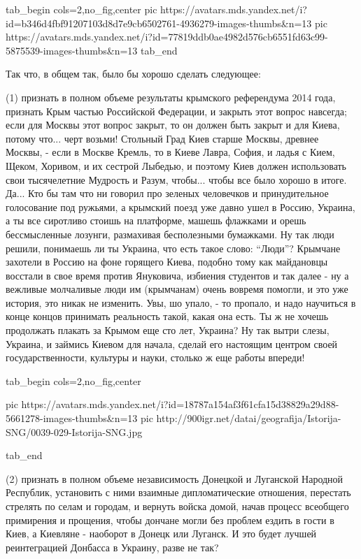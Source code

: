 \ifcmt
  tab_begin cols=2,no_fig,center
     pic https://avatars.mds.yandex.net/i?id=b346d4fbf91207103d8d7e9cb6502761-4936279-images-thumbs&n=13
     pic https://avatars.mds.yandex.net/i?id=77819ddb0ae4982d576cb6551fd63c99-5875539-images-thumbs&n=13
  tab_end
\fi

Так что, в общем так, было бы хорошо сделать следующее:

(1) признать в полном объеме результаты крымского референдума 2014 года,
признать Крым частью Российской Федерации, и закрыть этот вопрос навсегда; если
для Москвы этот вопрос закрыт, то он должен быть закрыт и для Киева, потому
что...  черт возьми! Стольный Град Киев старше Москвы, древнее Москвы, - если в
Москве Кремль, то в Киеве Лавра, София, и ладья с Кием, Щеком, Хоривом, и их
сестрой Лыбедью, и поэтому Киев должен использовать свои тысячелетние Мудрость
и Разум, чтобы... чтобы все было хорошо в итоге.  Да... Кто бы там что ни
говорил про зеленых человечков и принудительное голосование под ружьями, а
крымский поезд уже давно ушел в Россию, Украина, а ты все сиротливо стоишь на
платформе, машешь флажками и орешь бессмысленные лозунги, размахивая
бесполезными бумажками. Ну так люди решили, понимаешь ли ты Украина, что есть
такое слово: \enquote{Люди}? Крымчане захотели в Россию на фоне горящего Киева,
подобно тому как майдановцы восстали в свое время против Януковича, избиения
студентов и так далее - ну а вежливые молчаливые люди им (крымчанам) очень
вовремя помогли, и это уже история, это никак не изменить. Увы, шо упало, - то
пропало, и надо научиться в конце концов принимать реальность такой, какая она
есть. Ты ж не хочешь продолжать плакать за Крымом еще сто лет, Украина? Ну так
вытри слезы, Украина, и займись Киевом для начала, сделай его настоящим центром
своей государственности, культуры и науки, столько ж еще работы впереди! 

\ifcmt
  tab_begin cols=2,no_fig,center

     pic https://avatars.mds.yandex.net/i?id=18787a154af3f61cfa15d38829a29d88-5661278-images-thumbs&n=13
     pic http://900igr.net/datai/geografija/Istorija-SNG/0039-029-Istorija-SNG.jpg 

  tab_end
\fi

(2) признать в полном объеме независимость Донецкой и Луганской Народной
Республик, установить с ними взаимные дипломатические отношения, перестать
стрелять по селам и городам, и вернуть войска домой, начав процесс всеобщего
примирения и прощения, чтобы дончане могли без проблем ездить в гости в Киев, а
Киевляне - наоборот в Донецк или Луганск. И это будет лучшей реинтеграцией
Донбасса в Украину, разве не так?
